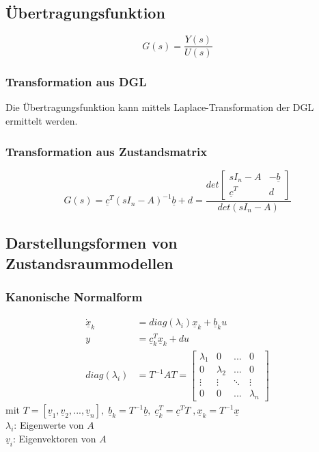 \documentclass[a4paper,twocolumn,10pt]{article}
\begin{document}
\subsection{Übertragungsfunktion}
\begin{equation*}
G(s)=\frac{Y(s)}{U(s)}
\end{equation*}

\subsubsection{Transformation aus DGL}
Die Übertragungsfunktion kann mittels Laplace-Transformation der DGL ermittelt werden.

\subsubsection{Transformation aus Zustandsmatrix}
\begin{equation*}
G(s)=\underline{c}^T(sI_n-A)^{-1}\underline{b}+d=\frac{det\begin{bmatrix}sI_n-A & -\underline{b} \\ \underline{c}^T & d\end{bmatrix}}{det(sI_n-A)}
\end{equation*}

\subsection{Darstellungsformen von Zustandsraummodellen}

\subsubsection{Kanonische Normalform}
\begin{equation*}
\begin{split}
\underline{\dot{x}}_k&=diag(\lambda_i)\underline{x}_k+\underline{b}_ku\\
y&=\underline{c}_k^T\underline{x}_k+du\\
diag(\lambda_i)&=T^{-1}AT=\begin{bmatrix}\lambda_1 & 0 & ... & 0 \\ 0 & \lambda_2 & ... & 0 \\ \vdots & \vdots & \ddots & \vdots \\ 0 & 0 & ... & \lambda_n\end{bmatrix}
\end{split}
\end{equation*}
mit $T=[\underline{v}_1,\underline{v}_2,...,\underline{v}_n],\;\underline{b}_k=T^{-1}\underline{b},\;\underline{c}_k^T=\underline{c}^TT\;,\underline{x}_k=T^{-1}\underline{x}$\\
$\lambda_i$: Eigenwerte von $A$\\
$\underline{v}_i$: Eigenvektoren von $A$
\end{document}
